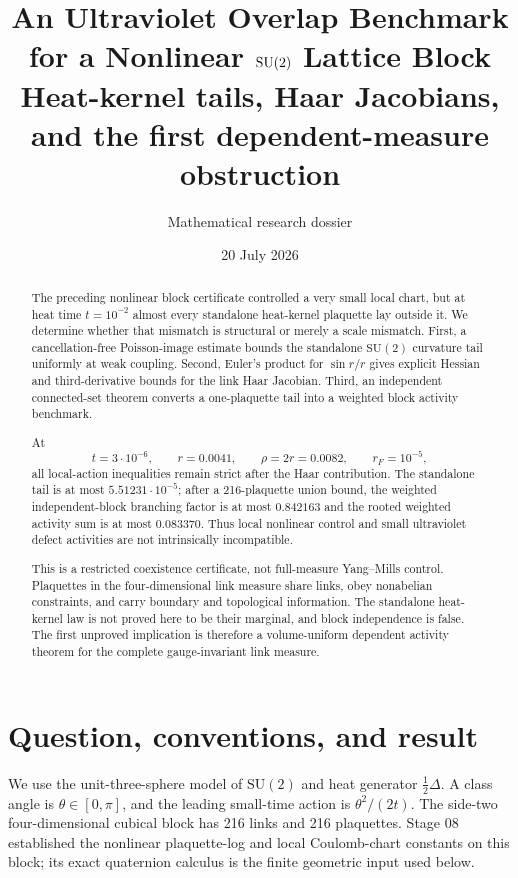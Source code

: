 \documentclass[11pt]{article}
\title{An Ultraviolet Overlap Benchmark for a Nonlinear $\SU$ Lattice Block\\
\large Heat-kernel tails, Haar Jacobians, and the first dependent-measure obstruction}
\author{Mathematical research dossier}
\date{20 July 2026}
\theoremstyle{definition}
\newcommand{\SU}{\mathrm{SU}(2)}
\begin{document}
\maketitle

\begin{abstract}
The preceding nonlinear block certificate controlled a very small local
chart, but at heat time $t=10^{-2}$ almost every standalone heat-kernel
plaquette lay outside it.  We determine whether that mismatch is structural
or merely a scale mismatch.  First, a cancellation-free Poisson-image
estimate bounds the standalone $\SU$ curvature tail uniformly at weak
coupling.  Second, Euler's product for $\sin r/r$ gives explicit Hessian and
third-derivative bounds for the link Haar Jacobian.  Third, an independent
connected-set theorem converts a one-plaquette tail into a weighted block
activity benchmark.

At
\[
 t=3\cdot10^{-6},\qquad r=0.0041,\qquad \rho=2r=0.0082,
 \qquad r_F=10^{-5},
\]
all local-action inequalities remain strict after the Haar contribution.  The
standalone tail is at most $5.51231\cdot10^{-5}$; after a 216-plaquette union
bound, the weighted independent-block branching factor is at most $0.842163$
and the rooted weighted activity sum is at most $0.083370$.  Thus local
nonlinear control and small ultraviolet defect activities are not
intrinsically incompatible.

This is a restricted coexistence certificate, not full-measure Yang--Mills
control.  Plaquettes in the four-dimensional link measure share links, obey
nonabelian constraints, and carry boundary and topological information.  The
standalone heat-kernel law is not proved here to be their marginal, and block
independence is false.  The first unproved implication is therefore a
volume-uniform dependent activity theorem for the complete gauge-invariant
link measure.
\end{abstract}

\tableofcontents

\section{Question, conventions, and result}

We use the unit-three-sphere model of $\SU$ and heat generator
$\tfrac12\Delta$.  A class angle is $\theta\in[0,\pi]$, and the leading
small-time action is $\theta^2/(2t)$.  The side-two four-dimensional cubical
block has 216 links and 216 plaquettes.  Stage 08 established the nonlinear
plaquette-log and local Coulomb-chart constants on this block; its exact
quaternion calculus is the finite geometric input used below.
\end{document}
